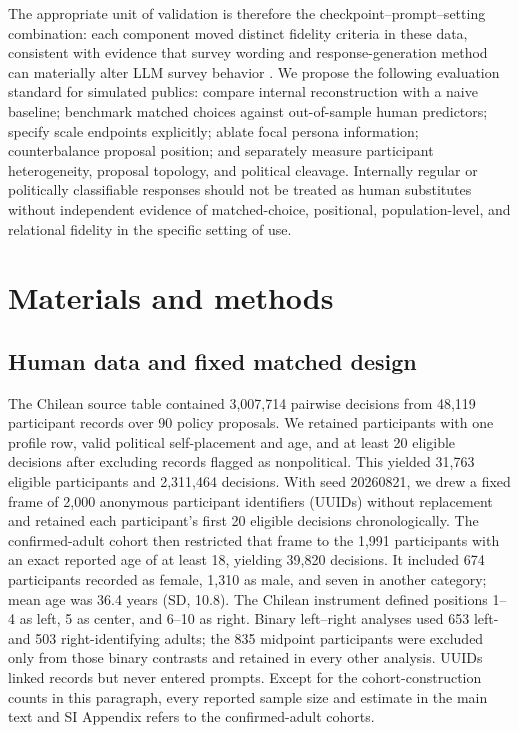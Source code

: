 \documentclass[unnumsec,webpdf,modern,large]{oup-authoring-template}
\begin{document}
The appropriate unit of validation is therefore the checkpoint--prompt--setting combination: each component moved distinct fidelity criteria in these data, consistent with evidence that survey wording and response-generation method can materially alter LLM survey behavior \citep{Tjuatja2024,Ahnert2026}. We propose the following evaluation standard for simulated publics: compare internal reconstruction with a naive baseline; benchmark matched choices against out-of-sample human predictors; specify scale endpoints explicitly; ablate focal persona information; counterbalance proposal position; and separately measure participant heterogeneity, proposal topology, and political cleavage. Internally regular or politically classifiable responses should not be treated as human substitutes without independent evidence of matched-choice, positional, population-level, and relational fidelity in the specific setting of use.

\section{Materials and methods}

\subsection{Human data and fixed matched design}

The Chilean source table contained 3,007,714 pairwise decisions from 48,119 participant records over 90 policy proposals. We retained participants with one profile row, valid political self-placement and age, and at least 20 eligible decisions after excluding records flagged as nonpolitical. This yielded 31,763 eligible participants and 2,311,464 decisions. With seed 20260821, we drew a fixed frame of 2,000 anonymous participant identifiers (UUIDs) without replacement and retained each participant's first 20 eligible decisions chronologically. The confirmed-adult cohort then restricted that frame to the 1,991 participants with an exact reported age of at least 18, yielding 39,820 decisions. It included 674 participants recorded as female, 1,310 as male, and seven in another category; mean age was 36.4 years (SD, 10.8). The Chilean instrument defined positions 1--4 as left, 5 as center, and 6--10 as right. Binary left--right analyses used 653 left- and 503 right-identifying adults; the 835 midpoint participants were excluded only from those binary contrasts and retained in every other analysis. UUIDs linked records but never entered prompts. Except for the cohort-construction counts in this paragraph, every reported sample size and estimate in the main text and SI Appendix refers to the confirmed-adult cohorts.
\end{document}
